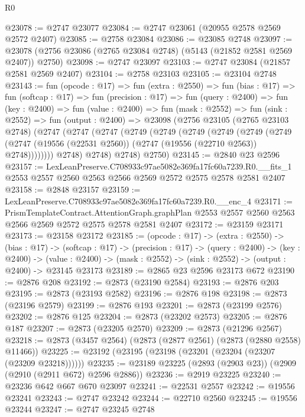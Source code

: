 \begin{lexlean}{R0}
\begin{coremodule}
@23078 := @2747 @23077
@23084 := @2747 @23061 (@20955 @2578 @2569 @2572 @2407)
@23085 := @2758 @23084
@23086 := @23085 @2748
@23097 := @23078 (@2756 @23086 (@2765 @23084 @2748) (@5143 (@21852 @2581 @2569 @2407)) @2750)
@23098 := @2747 @23097
@23103 := @2747 @23084 (@21857 @2581 @2569 @2407)
@23104 := @2758 @23103
@23105 := @23104 @2748
@23143 := fun (opcode : @17) =>
  fun (extra : @2550) =>
  fun (bias : @17) =>
  fun (softcap : @17) =>
  fun (precision : @17) =>
  fun (query : @2400) =>
  fun (key : @2400) =>
  fun (value : @2400) =>
  fun (mask : @2552) =>
  fun (sink : @2552) =>
  fun (output : @2400) =>
  @23098
    (@2756
      @23105
      (@2765 @23103 @2748)
      (@2747
        (@2747
          (@2747
            (@2749
              (@2749
                (@2749
                  (@2749
                    (@2749
                      (@2749
                        (@2747 (@19556 (@22531 @2560)) (@2747 (@19556 (@22710 @2563)) @2748))))))))
            @2748)
          @2748)
        @2748)
      @2750)
@23145 := @2840 @23 @2596
@23157 := LexLeanPreserve.C708933c97ae5082e369fa17fc60a7239.R0.__fits_1
    @2553
    @2557
    @2560
    @2563
    @2566
    @2569
    @2572
    @2575
    @2578
    @2581
    @2407
@23158 := @2848 @23157
@23159 := LexLeanPreserve.C708933c97ae5082e369fa17fc60a7239.R0.__enc_4
@23171 := PrismTemplateContract.AttentionGraph.graphPlan
    @2553
    @2557
    @2560
    @2563
    @2566
    @2569
    @2572
    @2575
    @2578
    @2581
    @2407
@23172 := @23159 @23171
@23173 := @23158 @23172
@23185 := (opcode : @17) ->
  (extra : @2550) ->
  (bias : @17) ->
  (softcap : @17) ->
  (precision : @17) ->
  (query : @2400) ->
  (key : @2400) ->
  (value : @2400) -> (mask : @2552) -> (sink : @2552) -> (output : @2400) -> @23145 @23173
@23189 := @2865 @23 @2596 @23173 @672
@23190 := @2876 @208
@23192 := @2873 (@23190 @2584)
@23193 := @2876 @203
@23195 := @2873 (@23193 @2582)
@23196 := @2876 @198
@23198 := @2873 (@23196 @2579)
@23199 := @2876 @193
@23201 := @2873 (@23199 @2576)
@23202 := @2876 @125
@23204 := @2873 (@23202 @2573)
@23205 := @2876 @187
@23207 := @2873 (@23205 @2570)
@23209 := @2873 (@21296 @2567)
@23218 := @2873 (@3457 @2564) (@2873 (@2877 @2561) (@2873 (@2880 @2558) @11466))
@23225 := @23192 (@23195 (@23198 (@23201 (@23204 (@23207 (@23209 @23218))))))
@23235 := @23189 @23225 (@2893 (@2903 @23)) (@2909 (@2910 (@2911 @672) @2596 @2886))
@23236 := @2919 @23225
@23240 := @23236 @642 @667 @670 @23097
@23241 := @22531 @2557
@23242 := @19556 @23241
@23243 := @2747 @23242
@23244 := @22710 @2560
@23245 := @19556 @23244
@23247 := @2747 @23245 @2748

\end{coremodule}
\end{lexlean}
